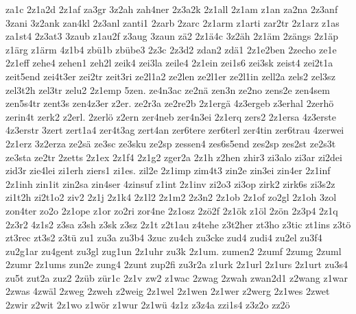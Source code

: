 {za1c
2z1a2d
2z1af
za3gr
3z2ah
zah4ner
2z3a2k
2z1all
2z1am
z1an
za2na
2z3anf
3zani
3z2ank
zan4kl
2z3anl
zanti1
2zarb
2zarc
2z1arm
z1arti
zar2tr
2z1arz
z1as
za1st4
2z3at3
3zaub
z1au2f
z3aug
3zaun
zä2
2z1ä4c
3z2äh
2z1äm
2zängs
2z1äp
z1ärg
z1ärm
4z1b4
zbü1b
zbübe3
2z3c
2z3d2
zdan2
zdä1
2z1e2ben
2zecho
ze1e
2z1eff
zehe4
zehen1
zeh2l
zeik4
zei3la
zeile4
2z1ein
zei1s6
zei3sk
zeist4
zei2t1a
zeit5end
zei4t3er
zei2tr
zeit3ri
ze2l1a2
ze2len
ze2l1er
ze2l1in
zell2a
zels2
zel3sz
zel3t2h
zel3tr
zelu2
2z1emp
5zen.
ze4n3ac
ze2nä
zen3n
ze2no
zens2e
zen4sem
zen5s4tr
zent3s
zen4z3er
z2er.
ze2r3a
ze2re2b
2z1ergä
4z3ergeb
z3erhal
2zerhö
zerin4t
zerk2
z2erl.
2zerlö
z2ern
zer4neb
zer4n3ei
2z1erq
zers2
2z1ersa
4z3erste
4z3erstr
3zert
zert1a4
zer4t3ag
zert4an
zer6tere
zer6terl
zer4tin
zer6trau
4zerwei
2z1erz
3z2erza
ze2sä
ze3sc
ze3sku
ze2sp
zessen4
zes6s5end
zes2sp
zes2st
ze2s3t
ze3sta
ze2tr
2zetts
2z1ex
2z1f4
2z1g2
zger2a
2z1h
z2hen
zhir3
zi3alo
zi3ar
zi2dei
zid3r
zie4lei
zi1erh
ziers1
zi1es.
zil2e
2z1imp
zim4t3
zin2e
zin3ei
zin4er
2z1inf
2z1inh
zin1it
zin2sa
zin4ser
4zinsuf
z1int
2z1inv
zi2o3
zi3op
zirk2
zirk6s
zi3s2z
zi1t2h
zi2t1o2
ziv2
2z1j
2z1k4
2z1l2
2z1m2
2z3n2
2z1ob
2z1of
zo2gl
2z1oh
3zol
zon4ter
zo2o
2z1ope
z1or
zo2ri
zor4ne
2z1osz
2zö2f
2z1ök
z1öl
2zön
2z3p4
2z1q
2z3r2
4z1s2
z3sa
z3sh
z3sk
z3sz
2z1t
z2t1au
z4tehe
z3t2her
zt3ho
z3tic
zt1ins
z3tö
zt3rec
zt3s2
z3tü
zu1
zu3a
zu3b4
3zuc
zu4ch
zu3cke
zud4
zudi4
zu2el
zu3f4
zu2g1ar
zu4gent
zu3gl
zug1un
2z1uhr
zu3k
2z1um.
zumen2
2zumf
2zumg
2zuml
2zumr
2z1ums
zun2e
zung4
2zunt
zup2fi
zu3r2a
z1urk
2z1url
2z1urs
2z1urt
zu3s4
zu5t
zut2a
zuz2
2züb
zür1c
2z1v
zw2
z1wac
2zwag
2zwah
zwan2d1
z2wang
z1war
2zwas
4zwäl
2zweg
2zweh
z2weig
2z1wel
2z1wen
2z1wer
z2werg
2z1wes
2zwet
2zwir
z2wit
2z1wo
z1wör
z1wur
2z1wü
4z1z
z3z4a
zzi1s4
z3z2o
zz2ö
}

\endinput

